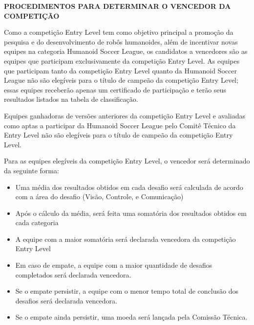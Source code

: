 \clearpage
\sffamily
{\bfseries\color[rgb]{0.4,0.4,0.4}
	PROCEDIMENTOS PARA DETERMINAR O VENCEDOR DA COMPETIÇÃO}
{}

\bigskip

Como a competição Entry Level tem como objetivo principal a promoção da
pesquisa e do desenvolvimento de robôs humanoides, além de incentivar novas
equipes na categoria Humanoid Soccer League, os candidatos a vencedores são as
equipes que participam exclusivamente da competição Entry Level. As equipes que
participam tanto da competição Entry Level quanto da Humanoid Soccer League não
são elegíveis para o título de campeão da competição Entry Level; essas equipes
receberão apenas um certificado de participação e terão seus resultados
listados na tabela de classificação.

Equipes ganhadoras de versões anteriores da competição Entry Level e avaliadas
como aptas a participar da Humanoid Soccer League pelo Comitê Técnico da Entry
Level não são elegíveis para o título de campeão da competição Entry Level.

Para as equipes elegíveis da competição Entry Level, o vencedor será
determinado da seguinte forma:

\begin{itemize}
	\item Uma média dos resultados obtidos em cada desafio será calculada
	      de
	      acordo com a área do desafio (Visão, Controle, e Comunicação)
	\item Após o cálculo da média, será feita uma somatória dos resultados
	      obtidos em cada categoria
	\item A equipe com a maior somatória será declarada vencedora da
	      competição
	      Entry Level
	\item Em caso de empate, a equipe com a maior quantidade de desafios
	      completados será declarada vencedora.
	\item Se o empate persistir, a equipe com o menor tempo total de
	      conclusão
	      dos desafios será declarada vencedora.
	\item Se o empate ainda persistir, uma moeda será lançada pela Comissão
	      Técnica.
\end{itemize}
